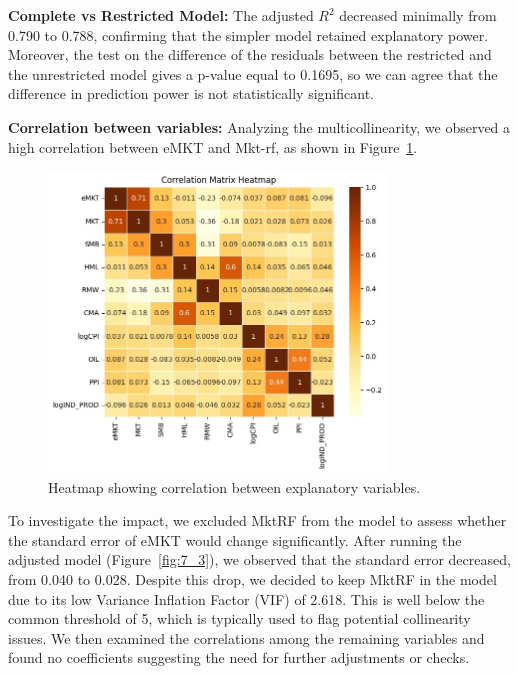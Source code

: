 \textbf{Complete vs Restricted Model:} The adjusted $R^2$ decreased minimally from 0.790 to 0.788, confirming that the simpler 
model retained explanatory power. 
Moreover, the test on the difference of the residuals between the restricted and the unrestricted model gives a p-value 
equal to 0.1695, so we can agree that the difference in prediction power is not statistically significant.

\textbf{Correlation between variables:} Analyzing the multicollinearity, we observed a high correlation between eMKT and 
Mkt-rf, as shown in Figure~\ref{fig:correlation}. 

\begin{figure}[h!]
    \centering
    \includegraphics[width=0.8\textwidth]{images/correlation.jpeg}
    \caption{Heatmap showing correlation between explanatory variables.}\label{fig:correlation}
\end{figure}

To investigate the impact, we excluded MktRF from the model to assess whether the standard error of eMKT would change
significantly.
After running the adjusted model (Figure~\ref{fig:7_3}), we observed that the standard error decreased, from 0.040 to 0.028.
Despite this drop, we decided to keep MktRF in the model due to its low Variance Inflation Factor (VIF) of 2.618.
This is well below the common threshold of 5, which is typically used to flag potential collinearity issues.
We then examined the correlations among the remaining variables and found no coefficients suggesting the need for further
 adjustments or checks.

